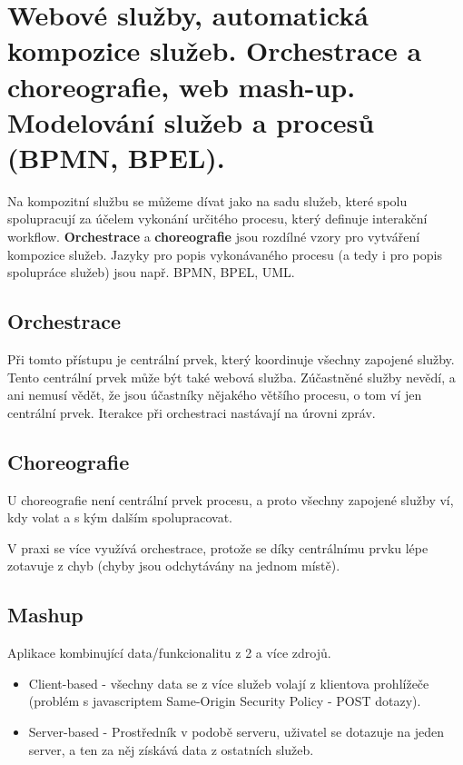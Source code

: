 \section[AOS - Kompozice služeb]{Webové služby, automatická kompozice služeb. Orchestrace a choreografie, web mash-up. Modelování služeb a procesů (BPMN, BPEL).}

Na kompozitní službu se můžeme dívat jako na sadu služeb, které spolu spolupracují za účelem vykonání určitého procesu, který definuje interakční workflow. \textbf{Orchestrace} a \textbf{choreografie} jsou rozdílné vzory pro vytváření kompozice služeb. Jazyky pro popis vykonávaného procesu (a tedy i pro popis spolupráce služeb) jsou např. BPMN, BPEL, UML.

\subsection{Orchestrace}
Při tomto přístupu je centrální prvek, který koordinuje všechny zapojené služby. Tento centrální prvek může být také webová služba. Zúčastněné služby nevědí, a ani nemusí vědět, že jsou účastníky nějakého většího procesu, o tom ví jen centrální prvek. Iterakce při orchestraci nastávají na úrovni zpráv.

\subsection{Choreografie}
U choreografie není centrální prvek procesu, a proto všechny zapojené služby ví, kdy volat a s kým dalším spolupracovat.

V praxi se více využívá orchestrace, protože se díky centrálnímu prvku lépe zotavuje z chyb (chyby jsou odchytávány na jednom místě).

\subsection{Mashup}
Aplikace kombinující data/funkcionalitu z 2 a více zdrojů.

\begin{itemize}[itemsep=0px]
\item Client-based - všechny data se z více služeb volají z klientova prohlížeče (problém s javascriptem Same-Origin Security Policy - POST dotazy).
\item Server-based - Prostředník v podobě serveru, uživatel se dotazuje na jeden server, a ten za něj získává data z ostatních služeb.
\end{itemize}

